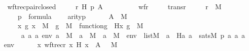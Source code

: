 \begin{isabellebody}
\isamarkupfalse%
\ wftrec{\isacharunderscore}{\kern0pt}pair{\isacharunderscore}{\kern0pt}closed\ {\isacharcolon}{\kern0pt}\ \isanewline
\ \ \ r\ H\ p\ A\ \ \isanewline
\ \ \ \isanewline
\ \ \ \ {\isachardoublequoteopen}wf{\isacharparenleft}{\kern0pt}r{\isacharparenright}{\kern0pt}{\isachardoublequoteclose}\ \isanewline
\ \ \ \ {\isachardoublequoteopen}trans{\isacharparenleft}{\kern0pt}r{\isacharparenright}{\kern0pt}{\isachardoublequoteclose}\ \isanewline
\ \ \ \ {\isachardoublequoteopen}r\ {\isasymin}\ M{\isachardoublequoteclose}\ \isanewline
\ \ \ \ {\isachardoublequoteopen}p\ {\isasymin}\ formula{\isachardoublequoteclose}\isanewline
\ \ \ \ {\isachardoublequoteopen}arity{\isacharparenleft}{\kern0pt}p{\isacharparenright}{\kern0pt}\ {\isasymle}\ {}{\isachardoublequoteclose}\isanewline
\ \ \ \ {\isachardoublequoteopen}A\ {\isasymin}\ M{\isachardoublequoteclose}\ \isanewline
\ \ \ \ {\isachardoublequoteopen}{\isacharparenleft}{\kern0pt}{\isasymAnd}x\ g{\isachardot}{\kern0pt}\ x\ {\isasymin}\ M\ {\isasymLongrightarrow}\ g\ {\isasymin}\ M\ {\isasymLongrightarrow}\ function{\isacharparenleft}{\kern0pt}g{\isacharparenright}{\kern0pt}\ {\isasymLongrightarrow}\ H{\isacharparenleft}{\kern0pt}x{\isacharcomma}{\kern0pt}\ g{\isacharparenright}{\kern0pt}\ {\isasymin}\ M{\isacharparenright}{\kern0pt}{\isachardoublequoteclose}\ \isanewline
\ \ \ \ {\isachardoublequoteopen}\ {\isacharparenleft}{\kern0pt}{\isasymAnd}a{}\ a{}\ a{}\ env{\isachardot}{\kern0pt}\ a{}\ {\isasymin}\ M\ {\isasymLongrightarrow}\ a{}\ {\isasymin}\ M\ {\isasymLongrightarrow}\ a{}\ {\isasymin}\ M\ {\isasymLongrightarrow}\ env\ {\isasymin}\ list{\isacharparenleft}{\kern0pt}M{\isacharparenright}{\kern0pt}\ {\isasymLongrightarrow}\ a{}\ {\isacharequal}{\kern0pt}\ H{\isacharparenleft}{\kern0pt}a{}{\isacharcomma}{\kern0pt}\ a{}{\isacharparenright}{\kern0pt}\ {\isasymlongleftrightarrow}\ sats{\isacharparenleft}{\kern0pt}M{\isacharcomma}{\kern0pt}\ p{\isacharcomma}{\kern0pt}\ {\isacharbrackleft}{\kern0pt}a{}{\isacharcomma}{\kern0pt}\ a{}{\isacharcomma}{\kern0pt}\ a{}{\isacharbrackright}{\kern0pt}\ {\isacharat}{\kern0pt}\ env{\isacharparenright}{\kern0pt}{\isacharparenright}{\kern0pt}{\isachardoublequoteclose}\ \ \isanewline
\ \ \ {\isachardoublequoteopen}{\isacharbraceleft}{\kern0pt}\ {\isacharless}{\kern0pt}x{\isacharcomma}{\kern0pt}\ wftrec{\isacharparenleft}{\kern0pt}r{\isacharcomma}{\kern0pt}\ x{\isacharcomma}{\kern0pt}\ H{\isacharparenright}{\kern0pt}{\isachargreater}{\kern0pt}{\isachardot}{\kern0pt}\ x\ {\isasymin}\ A\ {\isacharbraceright}{\kern0pt}\ {\isasymin}\ M{\isachardoublequoteclose}\ \isanewline

\end{isabellebody}
